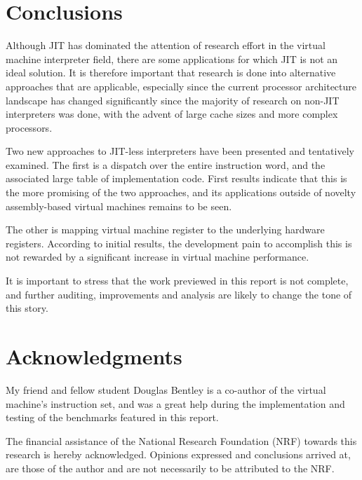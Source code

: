 \documentclass[A4]{sig-alternate}
\begin{document}
\section{Conclusions}
\label{sec:conclusion}
Although JIT has dominated the attention of research effort in the virtual machine interpreter field, there are some applications for which JIT is not an ideal solution. It is therefore important that research is done into alternative approaches that are applicable, especially since the current processor architecture landscape has changed significantly since the majority of research on non-JIT interpreters was done, with the advent of large cache sizes and more complex processors.

Two new approaches to JIT-less interpreters have been presented and tentatively examined. The first is a dispatch over the entire instruction word, and the associated large table of implementation code. First results indicate that this is the more promising of the two approaches, and its applications outside of novelty assembly-based virtual machines remains to be seen.

The other is mapping virtual machine register to the underlying hardware registers. According to initial results, the development pain to accomplish this is not rewarded by a significant increase in virtual machine performance.

It is important to stress that the work previewed in this report is not complete, and further auditing, improvements and analysis are likely to change the tone of this story.


\section{Acknowledgments}
My friend and fellow student Douglas Bentley is a co-author of the virtual machine's instruction set, and was a great help during the implementation and testing of the benchmarks featured in this report.

The financial assistance of the National Research Foundation (NRF) towards this research is hereby acknowledged. Opinions expressed and conclusions arrived at, are those of the author and are not necessarily to be attributed to the NRF.

%






%
%
\balancecolumns




\end{document}
